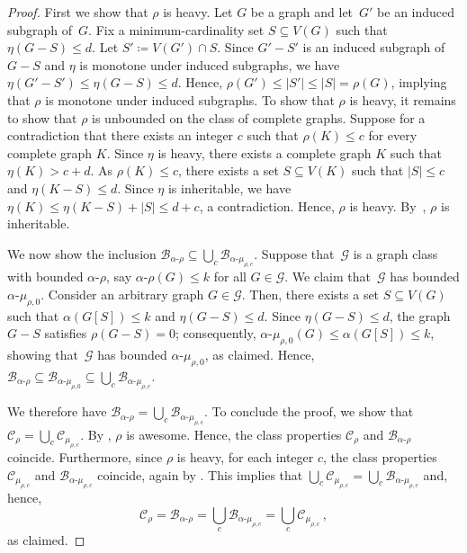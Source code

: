 \documentclass[11pt]{article}
\newcommand{\rhocm}{\mu_{\rho,c}}
\theoremstyle{plain}
\theoremstyle{definition}
\theoremstyle{remark}
\numberwithin{equation}{section}
\begin{document}
\begin{proof}
First we show that $\rho$ is heavy.
Let $G$ be a graph and let~$G'$ be an induced subgraph of~$G$.
Fix a minimum-cardinality set $S\subseteq V(G)$ such that $\eta(G-S) \le d$.
Let $S' \coloneqq V(G')\cap S$.
Since $G'-S'$ is an induced subgraph of $G-S$ and $\eta$ is monotone under induced subgraphs, we have $\eta(G'-S')\le \eta(G-S) \le d$.
Hence, $\rho(G')\le |S'|\le |S| = \rho(G)$, implying that $\rho$ is monotone under induced subgraphs.
To show that $\rho$ is heavy, it remains to show that $\rho$ is unbounded on the class of complete graphs.
Suppose for a contradiction that there exists an integer $c$ such that $\rho(K)\le c$ for every complete graph $K$.
Since $\eta$ is heavy, there exists a complete graph $K$ such that $\eta(K) > c+d$.
As $\rho(K)\le c$, there exists a set $S\subseteq V(K)$ such that $|S|\le c$ and $\eta(K-S)\le d$.
Since $\eta$ is inheritable, we have  $\eta(K)\le \eta(K-S) + |S|\le d+c$, a contradiction.
Hence, $\rho$ is heavy.
By~, $\rho$ is inheritable.

We now show the inclusion $\mathcal{B}_{\alpha\text{-}\rho}\subseteq \bigcup_c\mathcal{B}_{\alpha\text{-}\rhocm}$.
Suppose that~$\mathcal{G}$ is a graph class with bounded $\alpha\text{-}\rho$, say $\alpha\text{-}\rho(G)\le k$ for all $G\in \mathcal{G}$.
We claim that~$\mathcal{G}$ has bounded $\alpha\text{-}\mu_{\rho,0}$.
Consider an arbitrary graph $G\in \mathcal{G}$.
Then, there exists a set $S\subseteq V(G)$ such that $\alpha(G[S])\le k$ and $\eta(G-S)\le d$.
Since $\eta(G-S)\le d$, the graph $G-S$ satisfies $\rho(G-S) = 0$; consequently, $\alpha\text{-}\mu_{\rho,0}(G)\le \alpha(G[S])\le k$, showing that~$\mathcal{G}$ has bounded $\alpha\text{-}\mu_{\rho,0}$, as claimed.
Hence, $\mathcal{B}_{\alpha\text{-}\rho}\subseteq \mathcal{B}_{\alpha\text{-}\mu_{\rho,0}}\subseteq \bigcup_c\mathcal{B}_{\alpha\text{-}\rhocm}$.

We therefore have $\mathcal{B}_{\alpha\text{-}\rho} = \bigcup_{c}\mathcal{B}_{\alpha\text{-}\rhocm}$.
To conclude the proof, we show that $\mathcal{C}_{\rho} = \bigcup_{c}\mathcal{C}_{\rhocm}$.
By , $\rho$ is awesome. 
Hence, the class properties $\mathcal{C}_{\rho}$ and 
$\mathcal{B}_{\alpha\text{-}\rho}$ coincide.
Furthermore, since $\rho$ is heavy, for each integer $c$, the class properties $\mathcal{C}_{\rhocm}$ and $\mathcal{B}_{\alpha\text{-}\rhocm}$ coincide, again by .
This implies that $\bigcup_{c}\mathcal{C}_{\rhocm} = \bigcup_{c}\mathcal{B}_{\alpha\text{-}\rhocm}$ and, hence,
\[\mathcal{C}_{\rho} = \mathcal{B}_{\alpha\text{-}\rho} = \bigcup_{c}\mathcal{B}_{\alpha\text{-}\rhocm}
= \bigcup_{c}\mathcal{C}_{\rhocm}\,,\]
as claimed.
\end{proof}
\end{document}

